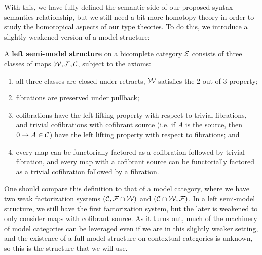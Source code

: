 \documentclass{amsart}
\begin{document}
With this, we have fully defined the semantic side of our proposed syntax-semantics relationship, but we still need a bit more homotopy theory in order to study the homotopical aspects of our type theories. To do this, we introduce a slightly weakened version of a model structure:
\begin{defn}\cite[Def. 6.6]{KL18}
    A \textbf{left semi-model structure} on a bicomplete category $\mathcal{E}$ consists of three classes of maps $\mathcal{W},\mathcal{F},\mathcal{C}$, subject to the axioms:
    \begin{enumerate}
        \item all three classes are closed under retracts, $\mathcal{W}$ satisfies the 2-out-of-3 property;
        \item fibrations are preserved under pullback;
        \item cofibrations have the left lifting property with respect to trivial fibrations, and trivial cofibrations with cofibrant source (i.e. if $A$ is the source, then $0\to A\in\mathcal{C}$) have the left lifting property with respect to fibrations; and
        \item every map can be functorially factored as a cofibration followed by trivial fibration, and every map with a cofibrant source can be functorially factored as a trivial cofibration followed by a fibration.
    \end{enumerate}
\end{defn}
One should compare this definition to that of a model category, where we have two weak factorization systems $(\mathcal{C},\mathcal{F}\cap\mathcal{W})$ and $(\mathcal{C}\cap\mathcal{W},\mathcal{F})$. In a left semi-model structure, we still have the first factorization system, but the later is weakened to only consider maps with cofibrant source. As it turns out, much of the machinery of model categories can be leveraged even if we are in this slightly weaker setting, and the existence of a full model structure on contextual categories is unknown, so this is the structure that we will use.
\end{document}
